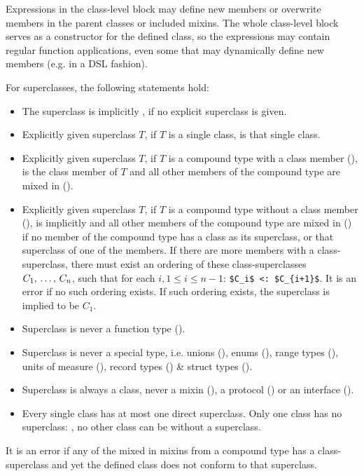 Expressions in the class-level block may define new members or overwrite members in the parent classes or included mixins. The whole class-level block serves as a constructor for the defined class, so the expressions may contain regular function applications, even some that may dynamically define new members (e.g. in a DSL fashion). 

For superclasses, the following statements hold:
\begin{itemize}
\item The superclass is implicitly , if no explicit superclass is given. 
\item Explicitly given superclass $T$, if $T$ is a single class, is that single class. 
\item Explicitly given superclass $T$, if $T$ is a compound type with a class member (), is the class member of $T$ and all other members of the compound type are mixed in (). 
\item Explicitly given superclass $T$, if $T$ is a compound type without a class member (), is implicitly  and all other members of the compound type are mixed in () if no member of the compound type has a class as its superclass, or that superclass of one of the members. If there are more members with a class-superclass, there must exist an ordering of these class-superclasses $C_1 ,\, \ldots ,\, C_n$, such that for each $i, 1 \le i \le n-1$: \lstinline!$C_i$ <: $C_{i+1}$!. It is an error if no such ordering exists. If such ordering exists, the superclass is implied to be $C_1$. 
\item Superclass is never a function type (). 
\item Superclass is never a special type, i.e. unions (), enums (), range types (), units of measure (), record types () \& struct types (). 
\item Superclass is always a class, never a mixin (), a protocol () or an interface (). 
\item Every single class has at most one direct superclass. Only one class has no superclass: , no other class can be without a superclass. 
\end{itemize}

It is an error if any of the mixed in mixins from a compound type has a class-superclass and yet the defined class does not conform to that superclass. 

